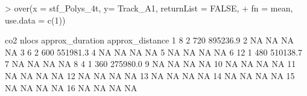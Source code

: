 \documentclass[12pt, oneside, a4paper]{scrbook}
\begin{document}
\begin{small}
\begin{Schunk}
\begin{Sinput}
> over(x = stf_Polys_4t, y= Track_A1, returnList = FALSE,
+      fn = mean, use.data = c(1))
\end{Sinput}
\begin{Soutput}
   co2 nlocs approx_duration approx_distance
1    8     2             720        895236.9
2   NA    NA              NA              NA
3    6     2             600        551981.3
4   NA    NA              NA              NA
5   NA    NA              NA              NA
6   12     1             480        510138.7
7   NA    NA              NA              NA
8    4     1             360        275980.0
9   NA    NA              NA              NA
10  NA    NA              NA              NA
11  NA    NA              NA              NA
12  NA    NA              NA              NA
13  NA    NA              NA              NA
14  NA    NA              NA              NA
15  NA    NA              NA              NA
16  NA    NA              NA              NA
\end{Soutput}
\end{Schunk}
\end{small}
\end{document}
